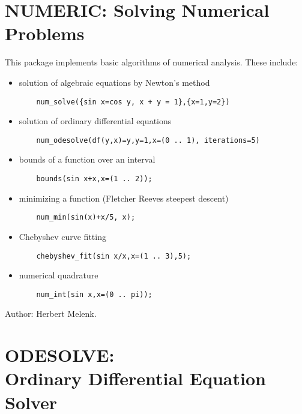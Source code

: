 \section{NUMERIC: Solving Numerical Problems}
This package implements basic algorithms of numerical analysis.
These include:
\begin{itemize}
\item solution of algebraic equations by Newton's method
\begin{verbatim}
    num_solve({sin x=cos y, x + y = 1},{x=1,y=2})
\end{verbatim}
\item solution of ordinary differential equations
\begin{verbatim}
    num_odesolve(df(y,x)=y,y=1,x=(0 .. 1), iterations=5)
\end{verbatim}
\item bounds of a function over an interval
\begin{verbatim}
    bounds(sin x+x,x=(1 .. 2));
\end{verbatim}
\item minimizing a function (Fletcher Reeves steepest descent)
\begin{verbatim}
    num_min(sin(x)+x/5, x);
\end{verbatim}
\item Chebyshev curve fitting
\begin{verbatim}
    chebyshev_fit(sin x/x,x=(1 .. 3),5);
\end{verbatim}
\item numerical quadrature
\begin{verbatim}
    num_int(sin x,x=(0 .. pi));
\end{verbatim}
\end{itemize}

Author: Herbert Melenk.


\fi

\newpage

\section[ODESOLVE: Ordinary Differential Equation Solver]%
        {ODESOLVE: \protect\\ Ordinary Differential Equation Solver}

